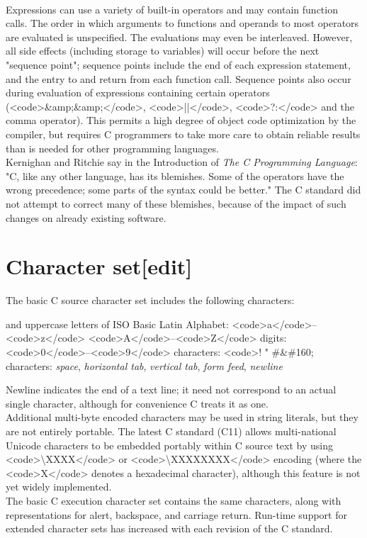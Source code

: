 \documentclass{article}\usepackage{titlesec}
\begin{document}
\\
Expressions can use a variety of built-in operators and may contain function calls. The order in which arguments to functions and operands to most operators are evaluated is unspecified. The evaluations may even be interleaved. However, all side effects (including storage to variables) will occur before the next "sequence point"; sequence points include the end of each expression statement, and the entry to and return from each function call.  Sequence points also occur during evaluation of expressions containing certain operators (<code>&amp;&amp;</code>, <code>||</code>, <code>?:</code> and the comma operator). This permits a high degree of object code optimization by the compiler, but requires C programmers to take more care to obtain reliable results than is needed for other programming languages.
\\
Kernighan and Ritchie say in the Introduction of \emph{The C Programming Language}: "C, like any other language, has its blemishes. Some of the operators have the wrong precedence; some parts of the syntax could be better." The C standard did not attempt to correct many of these blemishes, because of the impact of such changes on already existing software.
\\

\section{Character set[edit]}
The basic C source character set includes the following characters:
\\

\begin{itemize}\itemLowercase and uppercase letters of ISO Basic Latin Alphabet: <code>a</code>–<code>z</code> <code>A</code>–<code>Z</code>
\itemDecimal digits: <code>0</code>–<code>9</code>
\itemGraphic characters: <code>! " \#&\#160;%
\itemWhitespace characters: \emph{space}, \emph{horizontal tab}, \emph{vertical tab}, \emph{form feed}, \emph{newline}\end{itemize}
Newline indicates the end of a text line; it need not correspond to an actual single character, although for convenience C treats it as one.
\\
Additional multi-byte encoded characters may be used in string literals, but they are not entirely portable.  The latest C standard (C11) allows multi-national Unicode characters to be embedded portably within C source text by using <code>\textbackslash XXXX</code> or <code>\textbackslash XXXXXXXX</code> encoding (where the <code>X</code> denotes a hexadecimal character), although this feature is not yet widely implemented.
\\
The basic C execution character set contains the same characters, along with representations for alert, backspace, and carriage return. Run-time support for extended character sets has increased with each revision of the C standard.
\\
\end{document}

